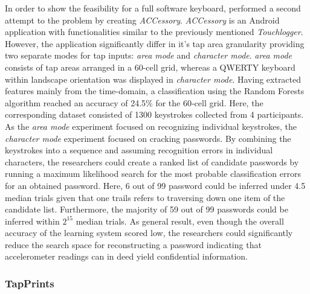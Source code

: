 In order to show the feasibility for a full software keyboard, \citeauthor{Accessory} performed a second attempt to the problem by creating \textit{ACCessory}. \textit{ACCessory} is an Android application with functionalities similar to the previously mentioned \textit{Touchlogger}. However, the application significantly differ in it's tap area granularity providing two separate modes for tap inputs: \textit{area mode} and \textit{character mode}. \textit{area mode} consists of tap areas arranged in a 60-cell grid, whereas a QWERTY keyboard within landscape orientation was displayed in \textit{character mode}. Having extracted features mainly from the time-domain, a classification using the Random Forests algorithm reached an accuracy of 24.5\% for the 60-cell grid. Here, the corresponding dataset consisted of 1300 keystrokes collected from 4 participants. As the \textit{area mode} experiment focused on recognizing individual keystrokes, the \textit{character mode} experiment focused on cracking passwords. By combining the keystrokes into a sequence and assuming recognition errors in individual characters, the researchers could create a ranked list of candidate passwords by running a maximum likelihood search for the most probable classification errors for an obtained password. Here, 6 out of 99 password could be inferred under 4.5 median trials given that one trails refers to traversing down one item of the candidate list. Furthermore, the majority of 59 out of 99 passwords could be inferred within $2^{15}$ median trials. As general result, even though the overall accuracy of the learning system scored low, the researchers could significantly reduce the search space for reconstructing a password indicating that accelerometer readings can in deed yield confidential information.

\subsubsection{TapPrints}

